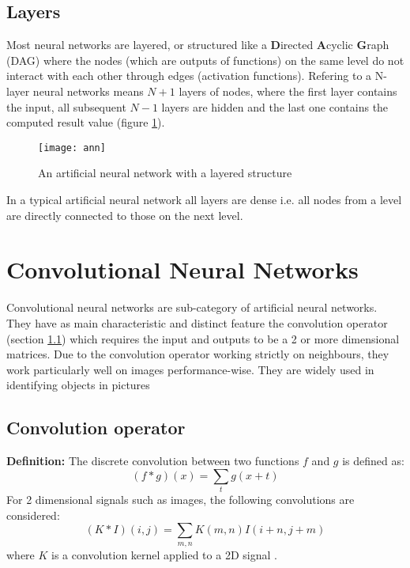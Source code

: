\subsection{Layers}
\label{subsec:obj_nn_layers}

Most neural networks are layered, or structured like a \textbf{D}irected \textbf{A}cyclic \textbf{G}raph (DAG) where the nodes (which are outputs of functions) on the same level do not interact with each other through edges (activation functions). Refering to a N-layer neural networks means $N+1$ layers of nodes, where the first layer contains the input, all subsequent $N-1$ layers are hidden and the last one contains the computed result value (figure \ref{fig:ann}).

\begin{figure}[b!]
\centering
\texttt{[image: ann]}
\caption{An artificial neural network with a layered structure}
\label{fig:ann}
\end{figure}

In a typical artificial neural network all layers are dense i.e. all nodes from a level are directly connected to those on the next level.

\section{Convolutional Neural Networks}
\label{sec:obj_cnn}

Convolutional neural networks are sub-category of artificial neural networks. They have as main characteristic and distinct feature the convolution operator (section \ref{subsec:obj_cnn_conv}) which requires the input and outputs to be a 2 or more dimensional matrices. Due to the convolution operator working strictly on neighbours, they work particularly well on images performance-wise. They are widely used in identifying objects in pictures

\subsection{Convolution operator}
\label{subsec:obj_cnn_conv}

\textbf{Definition:} The discrete convolution between two functions $f$ and $g$ is defined as: 
\[ (f * g)(x) = \sum_{t}{g(x + t)} \] 
For 2 dimensional signals such as images, the following convolutions are considered: 
\[ (K * I)(i, j) = \sum_{m,n}{K(m, n)I(i + n, j + m)}\]
where $K$ is a convolution kernel applied to a 2D signal \cite{toulouse-nn}.

